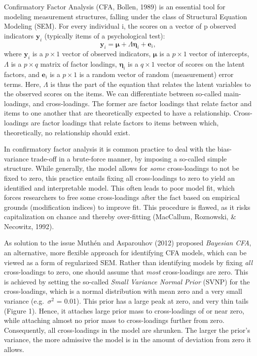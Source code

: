 \documentclass[
  man, donotrepeattitle,floatsintext]{apa6}
\begin{document}
Confirmatory Factor Analysis (CFA, Bollen, 1989) is an essential tool for modeling measurement structures, falling under the class of Structural Equation Modeling (SEM). For every individual i, the scores on a vector of p observed indicators \(\mathbf{y}_i\) (typically items of a psychological test):
\[\boldsymbol{y}_i = \boldsymbol{\mu} + \Lambda \boldsymbol{\eta}_i + \boldsymbol{e}_i ,\]
where \(\boldsymbol{y}_i\) is a \(p \times 1\) vector of observed indicators, \(\boldsymbol{\mu}\) is a \(p \times 1\) vector of intercepts, \(\Lambda\) is a \(p \times q\) matrix of factor loadings, \(\boldsymbol{\eta}_i\) is a \(q \times 1\) vector of scores on the latent factors, and \(\boldsymbol{e}_i\) is a \(p \times 1\) is a random vector of random (measurement) error terms. Here, \(\Lambda\) is thus the part of the equation that relates the latent variables to the observed scores on the items. We can differentiate between so-called main-loadings, and cross-loadings. The former are factor loadings that relate factor and items to one another that are theoretically expected to have a relationship. Cross-loadings are factor loadings that relate factors to items between which, theoretically, no relationship should exist.

In confirmatory factor analysis it is common practice to deal with the bias-variance trade-off in a brute-force manner, by imposing a so-called simple structure. While generally, the model allows for \emph{some} cross-loadings to not be fixed to zero, this practice entails fixing all cross-loadings to zero to yield an identified and interpretable model. This often leads to poor model fit, which forces researchers to free some cross-loadings after the fact based on empirical grounds (modification indices) to improve fit. This procedure is flawed, as it risks capitalization on chance and thereby over-fitting (MacCallum, Roznowski, \& Necowitz, 1992).

As solution to the issue Muthén and Asparouhov (2012) proposed \emph{Bayesian CFA}, an alternative, more flexible approach for identifying CFA models, which can be viewed as a form of regularized SEM. Rather than identifying models by fixing \emph{all} cross-loadings to zero, one should assume that \emph{most} cross-loadings are zero. This is achieved by setting the so-called \emph{Small Variance Normal Prior} (SVNP) for the cross-loadings, which is a normal distribution with mean zero and a very small variance (e.g.~\(\sigma^2\) = 0.01). This prior has a large peak at zero, and very thin tails (Figure 1). Hence, it attaches large prior mass to cross-loadings of or near zero, while attaching almost no prior mass to cross-loadings further from zero. Consequently, all cross-loadings in the model are shrunken. The larger the prior's variance, the more admissive the model is in the amount of deviation from zero it allows.
\end{document}
